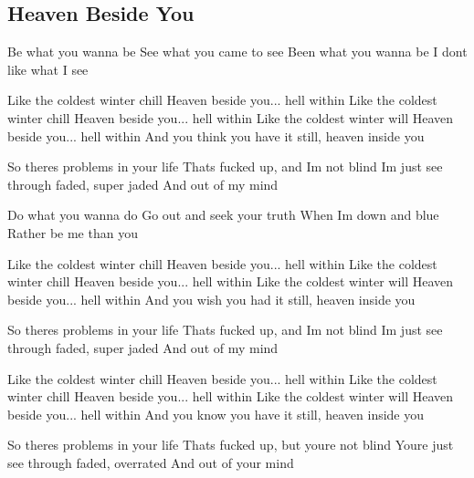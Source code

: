 \subsection*{Heaven Beside You   }



\begin{guitar}

Be what you wanna be
See what you came to see
Been what you wanna be
I dont like what I see

Like the coldest winter chill
Heaven beside you... hell within
Like the coldest winter chill
Heaven beside you... hell within
Like the coldest winter will
Heaven beside you... hell within
And you think you have it still, heaven inside you

So theres problems in your life
Thats fucked up, and Im not blind
Im just see through faded, super jaded
And out of my mind

Do what you wanna do
Go out and seek your truth
When Im down and blue
Rather be me than you

Like the coldest winter chill
Heaven beside you... hell within
Like the coldest winter chill
Heaven beside you... hell within
Like the coldest winter will
Heaven beside you... hell within
And you wish you had it still, heaven inside you

So theres problems in your life
Thats fucked up, and Im not blind
Im just see through faded, super jaded
And out of my mind

Like the coldest winter chill
Heaven beside you... hell within
Like the coldest winter chill
Heaven beside you... hell within
Like the coldest winter will
Heaven beside you... hell within
And you know you have it still, heaven inside you

So theres problems in your life
Thats fucked up, but youre not blind
Youre just see through faded, overrated
And out of your mind
\end{guitar}
